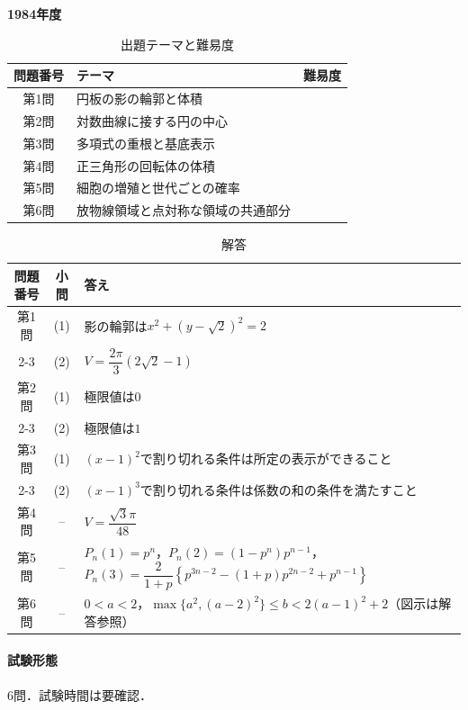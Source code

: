 \documentclass[../../main.tex]{subfiles}
\begin{document}
\begin{center}
  {\fontsize{48pt}{58pt}\selectfont \textbf{1984}\normalsize\textbf{年度}}
\end{center}

\begin{table}[htb]
  \centering
  \caption{出題テーマと難易度}
  \begin{tabular}{|c|p{9cm}|c|}
    \hline
    \textbf{問題番号} & \textbf{テーマ} & \textbf{難易度} \\
    \hline
    第1問 & 円板の影の輪郭と体積 & \\
    \hline
    第2問 & 対数曲線に接する円の中心 & \\
    \hline
    第3問 & 多項式の重根と基底表示 & \\
    \hline
    第4問 & 正三角形の回転体の体積 & \\
    \hline
    第5問 & 細胞の増殖と世代ごとの確率 & \\
    \hline
    第6問 & 放物線領域と点対称な領域の共通部分 & \\
    \hline
  \end{tabular}
\end{table}

\begin{table}[htb]
  \centering
  \caption{解答}
  \renewcommand{\arraystretch}{1.4}
  \begin{tabular}{|c|c|p{9cm}|}
    \hline
    \textbf{問題番号} & \textbf{小問} & \textbf{答え} \\
    \hline
    第1問 & (1) & 影の輪郭は$x^2+(y-\sqrt{2})^2=2$ \\
    \cline{2-3}
    & (2) & $V=\dfrac{2\pi}{3}(2\sqrt{2}-1)$ \\
    \hline
    第2問 & (1) & 極限値は$0$ \\
    \cline{2-3}
    & (2) & 極限値は$1$ \\
    \hline
    第3問 & (1) & $(x-1)^2$で割り切れる条件は所定の表示ができること \\
    \cline{2-3}
    & (2) & $(x-1)^3$で割り切れる条件は係数の和の条件を満たすこと \\
    \hline
    第4問 & -- & $V=\dfrac{\sqrt{3}\pi}{48}$ \\
    \hline
    第5問 & -- & $P_n(1)=p^n$，$P_n(2)=(1-p^n)p^{n-1}$，$P_n(3)=\dfrac{2}{1+p}\left\{p^{3n-2}-(1+p)p^{2n-2}+p^{n-1}\right\}$ \\
    \hline
    第6問 & -- & $0<a<2$，$\max\{a^2,(a-2)^2\}\le b<2(a-1)^2+2$（図示は解答参照） \\
    \hline
  \end{tabular}
\end{table}

\paragraph{試験形態}
6問．試験時間は要確認．
\end{document}
